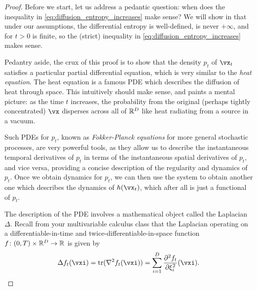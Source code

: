 \documentclass[../../book-main.tex]{subfiles}
\begin{document}
\begin{proof}
    Before we start, let us address a pedantic question: when does the inequality in \eqref{eq:diffusion_entropy_increases} make sense? We will show in  that under our assumptions, the differential entropy is well-defined, is never \(+\infty\), and for \(t > 0\) is finite, so the (strict) inequality in \eqref{eq:diffusion_entropy_increases} makes sense.

    Pedantry aside, the crux of this proof is to show that the density \(p_{t}\) of \(\vx_{t}\) satisfies a particular partial differential equation, which is very similar to the \textit{heat equation}. The heat equation is a famous PDE which describes the diffusion of heat through space. This intuitively should make sense, and paints a mental picture: as the time \(t\) increases, the probability from the original (perhaps tightly concentrated) \(\vx\) disperses across all of \(\mathbb{R}^{D}\) like heat radiating from a source in a vacuum.
    
    Such PDEs for \(p_{t}\), known as \textit{Fokker-Planck equations} for more general stochastic processes, are very powerful tools, as they allow us to describe the instantaneous temporal derivatives of \(p_{t}\) in terms of the instantaneous spatial derivatives of \(p_{t}\), and vice versa, providing a concise description of the regularity and dynamics of \(p_{t}\). Once we obtain dynamics for \(p_{t}\), we can then use the system to obtain another one which describes the dynamics of \(h(\vx_{t})\), which after all is just a functional of \(p_{t}\).  

    The description of the PDE involves a mathematical object called the Laplacian \(\Delta\). Recall from your multivariable calculus class that the Laplacian operating on a differentiable-in-time and twice-differentiable-in-space function \(f \colon (0, T) \times \mathbb{R}^{D} \to \mathbb{R}\) is given by
    \begin{equation}
        \Delta f_{t}(\vxi) = \tr(\nabla^{2}f_{t}(\vxi)) = \sum_{i = 1}^{D}\pdv[order=2]{f_{t}}{\xi_{i}}(\vxi).
    \end{equation}
    

\end{proof}
\end{document}
